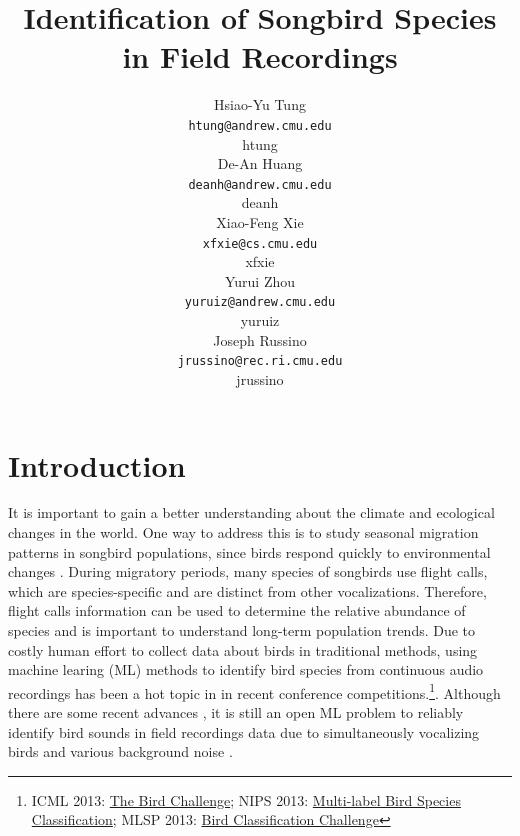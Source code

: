 \documentclass[12pt,peerreview,letterpaper]{IEEEtran}
\title{Identification of Songbird Species in Field Recordings}
\author{
Hsiao-Yu Tung \\
\texttt{htung@andrew.cmu.edu} \\
htung \\
\And
De-An Huang \\
\texttt{deanh@andrew.cmu.edu} \\
deanh \\
\And
Xiao-Feng Xie \\
\texttt{xfxie@cs.cmu.edu} \\
xfxie \\
\And
Yurui Zhou\\
\texttt{yuruiz@andrew.cmu.edu}\\
yuruiz \\
\And
Joseph Russino\\
\texttt{jrussino@rec.ri.cmu.edu}\\
jrussino \\
}
\begin{document}
\maketitle



\section{Introduction}

It is important to gain a better understanding about the climate and ecological changes in the world. One way to address this is to study seasonal migration patterns in songbird populations, since birds respond quickly to environmental changes \cite{walther2002ecological}.
During migratory periods, many species of songbirds use flight calls, which are species-specific and are distinct from other vocalizations. Therefore, flight calls information can be used to determine the relative abundance of species and is important to understand long-term population trends. Due to costly human effort to collect data about birds in traditional methods, using machine learing (ML) methods to identify bird species from continuous audio recordings has been a hot topic in in recent conference competitions.\footnote{\scriptsize ICML 2013: \href{http://www.kaggle.com/c/the-icml-2013-bird-challenge}{The Bird Challenge}; NIPS 2013: \href{http://www.kaggle.com/c/multi-label-bird-species-classification-nips2013}{
Multi-label Bird Species Classification}; MLSP 2013: \href{http://www.kaggle.com/c/mlsp-2013-birds}{Bird Classification Challenge}}. Although there are some recent advances \cite{briggs2013instance,Lasseck13,Massaron13,stattnersong13}, it is still an open ML problem to reliably identify bird sounds in field recordings data due to simultaneously vocalizing birds and various background noise \cite{BriggsMLSP13}.
\end{document}
